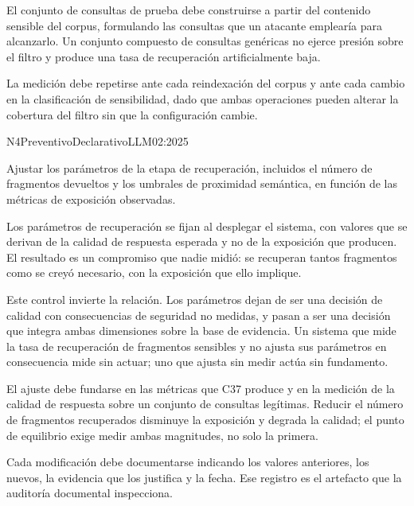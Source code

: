 El conjunto de consultas de prueba debe construirse a partir del contenido sensible del corpus, formulando las consultas que un atacante emplearía para alcanzarlo. Un conjunto compuesto de consultas genéricas no ejerce presión sobre el filtro y produce una tasa de recuperación artificialmente baja.

La medición debe repetirse ante cada reindexación del corpus y ante cada cambio en la clasificación de sensibilidad, dado que ambas operaciones pueden alterar la cobertura del filtro sin que la configuración cambie.


  {N4}{Preventivo}{Declarativo}{LLM02:2025}

Ajustar los parámetros de la etapa de recuperación, incluidos el número de fragmentos devueltos y los umbrales de proximidad semántica, en función de las métricas de exposición observadas.

Los parámetros de recuperación se fijan al desplegar el sistema, con valores que se derivan de la calidad de respuesta esperada y no de la exposición que producen. El resultado es un compromiso que nadie midió: se recuperan tantos fragmentos como se creyó necesario, con la exposición que ello implique.

Este control invierte la relación. Los parámetros dejan de ser una decisión de calidad con consecuencias de seguridad no medidas, y pasan a ser una decisión que integra ambas dimensiones sobre la base de evidencia. Un sistema que mide la tasa de recuperación de fragmentos sensibles y no ajusta sus parámetros en consecuencia mide sin actuar; uno que ajusta sin medir actúa sin fundamento.

El ajuste debe fundarse en las métricas que C37 produce y en la medición de la calidad de respuesta sobre un conjunto de consultas legítimas. Reducir el número de fragmentos recuperados disminuye la exposición y degrada la calidad; el punto de equilibrio exige medir ambas magnitudes, no solo la primera.

Cada modificación debe documentarse indicando los valores anteriores, los nuevos, la evidencia que los justifica y la fecha. Ese registro es el artefacto que la auditoría documental inspecciona.

